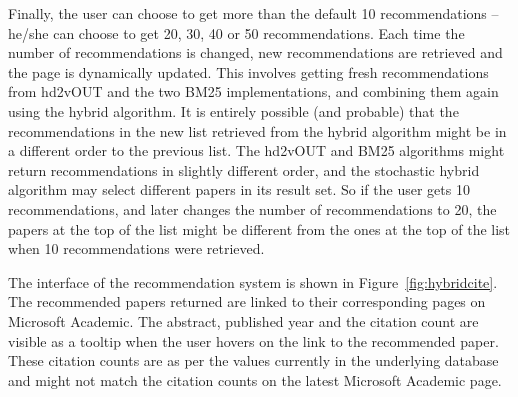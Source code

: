 Finally, the user can choose to get more than the default 10 recommendations -- he/she can choose to get 20, 30, 40 or 50 recommendations. Each time the number of recommendations is changed, new recommendations are retrieved and the page is dynamically updated. This involves getting fresh recommendations from hd2vOUT and the two BM25 implementations, and combining them again using the hybrid algorithm. It is entirely possible (and probable) that the recommendations in the new list retrieved from the hybrid algorithm might be in a different order to the previous list. The hd2vOUT and BM25 algorithms might return recommendations in slightly different order, and the stochastic hybrid algorithm may select different papers in its result set. So if the user gets 10 recommendations, and later changes the number of recommendations to 20, the papers at the top of the list might be different from the ones at the top of the list when 10 recommendations were retrieved.

The interface of the recommendation system is shown in Figure~\ref{fig:hybridcite}. The recommended papers returned are linked to their corresponding pages on Microsoft Academic. The abstract, published year and the citation count are visible as a tooltip when the user hovers on the link to the recommended paper. These citation counts are as per the values currently in the underlying database and might not match the citation counts on the latest Microsoft Academic page.